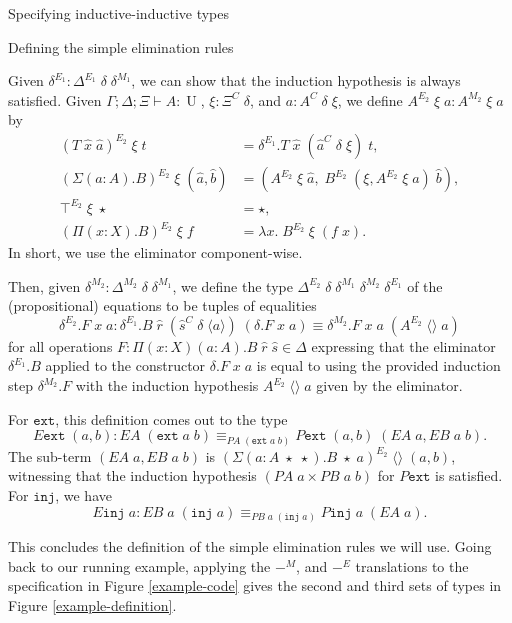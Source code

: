 \documentclass[runningheads]{llncs}
\DeclareMathOperator{\UU}{U}
\newcommand{\Id}[2]{{#1}\equiv{#2}}
\newcommand{\IdA}[3]{{#1}\equiv_{#3}{#2}}
\newcommand{\tac}{\vdash}
\newcommand{\join}{\texttt{ext}}
\newcommand{\inj}{\texttt{inj}}
\newcommand{\PA}{\mathit{PA}}
\newcommand{\PB}{\mathit{PB}}
\newcommand{\EA}{\mathit{EA}}
\newcommand{\EB}{\mathit{EB}}
\def\emptytuple{\langle\rangle}
\begin{document}
{\begin{section}{Specifying inductive-inductive types}
\begin{subsection}{\label{simple-elim-section}Defining the simple elimination rules}
\begin{definition}
Given $\delta^{E_1} : \Delta^{E_1}\;\delta\;\delta^{M_1}$, we can show that the induction hypothesis is always satisfied. Given $\Gamma ; \Delta ; \Xi \tac A : \UU$, $\xi : \Xi^C\;\delta$, and $a : A^C\;\delta\;\xi$, we define $A^{E_2}\;\xi\;a : A^{M_2}\;\xi\;a$ by
\begin{align*}
(T\;\hat{x}\;\hat{a})^{E_2}\;\xi\;t &= \delta^{E_1}.T\;\hat{x}\;(\hat{a}^C\;\delta\;\xi)\;t,\\
(\Sigma(a : A).B)^{E_2}\;\xi\;(\hat{a},\hat{b}) &= (A^{E_2}\;\xi\;\hat{a} ,\; B^{E_2}\;(\xi , A^{E_2}\;\xi\;a)\;\hat{b}),\\
\top^{E_2}\;\xi\;\star &= \star,\\
(\Pi(x : X).B)^{E_2}\;\xi\;f &= \lambda x.\; B^{E_2}\;\xi\;(f\;x).
\end{align*}
In short, we use the eliminator component-wise.

Then, given $\delta^{M_2} : \Delta^{M_2}\;\delta\;\delta^{M_1}$, we define the type $\Delta^{E_2}\;\delta\;\delta^{M_1}\;\delta^{M_2}\;\delta^{E_1}$ of the (propositional) equations to be tuples of equalities \[\delta^{E_2}.F\;x\;a : \Id{\delta^{E_1}.B\;\hat{r}\;(\hat{s}^C\;\delta\;\langle a \rangle)\;(\delta.F\;x\;a)}{\delta^{M_2}.F\;x\;a\;(A^{E_2}\;\emptytuple\;a)}\] for all operations $F : \Pi(x : X)(a : A).B\;\hat{r}\;\hat{s} \in\Delta$ expressing that the eliminator $\delta^{E_1}.B$ applied to the constructor $\delta.F\;x\;a$ is equal to using the provided induction step $\delta^{M_2}.F$ with the induction hypothesis $A^{E_2}\;\emptytuple\;a$ given by the eliminator.
\end{definition}

For $\join$, this definition comes out to the type \[E\join\;(a, b) : \IdA{\EA\;(\join\;a\;b)}{P\join\;(a,b)\;(\EA\;a, \EB\;a\;b)}{\PA\;(\join\;a\;b)}.\] The sub-term $(\EA\;a, \EB\;a\;b)$ is $(\Sigma(a : A\;\star\;\star).B\;\star\;a)^{E_2}\;\emptytuple\;(a, b)$, witnessing that the induction hypothesis $(\PA\;a \times \PB\;a\;b)$ for $P\join$ is satisfied. For $\inj$, we have \[E\inj\;a : \IdA{\EB\;a\;(\inj\;a)}{P\inj\;a\;(\EA\;a)}{\PB\;a\;(\inj\;a)}.\]

This concludes the definition of the simple elimination rules we will use. Going back to our running example, applying the $-^M$, and $-^E$ translations to the specification in Figure \ref{example-code} gives the second and third sets of types in Figure \ref{example-definition}.


\end{subsection}
\end{section}}
\end{document}
